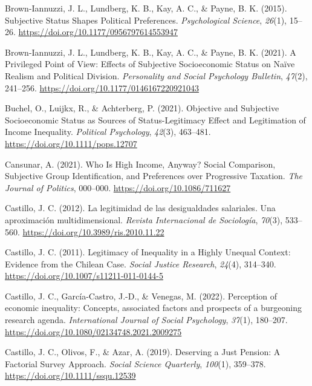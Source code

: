 \documentclass[
  12pt,
]{book}
\newlength{\cslhangindent}
\newenvironment{cslreferences}%
  {\setlength{\parindent}{0pt}%
  \everypar{\setlength{\hangindent}{\cslhangindent}}\ignorespaces}%
  {\par}
\begin{document}
\begin{cslreferences}
\leavevmode\hypertarget{ref-brown-iannuzzi_subjective_2015}{}%
Brown-Iannuzzi, J. L., Lundberg, K. B., Kay, A. C., \& Payne, B. K. (2015). Subjective Status Shapes Political Preferences. \emph{Psychological Science}, \emph{26}(1), 15--26. \url{https://doi.org/10.1177/0956797614553947}

\leavevmode\hypertarget{ref-brown-iannuzzi_privileged_2021}{}%
Brown-Iannuzzi, J. L., Lundberg, K. B., Kay, A. C., \& Payne, B. K. (2021). A Privileged Point of View: Effects of Subjective Socioeconomic Status on Naïve Realism and Political Division. \emph{Personality and Social Psychology Bulletin}, \emph{47}(2), 241--256. \url{https://doi.org/10.1177/0146167220921043}

\leavevmode\hypertarget{ref-buchel_objective_2021}{}%
Buchel, O., Luijkx, R., \& Achterberg, P. (2021). Objective and Subjective Socioeconomic Status as Sources of Status-Legitimacy Effect and Legitimation of Income Inequality. \emph{Political Psychology}, \emph{42}(3), 463--481. \url{https://doi.org/10.1111/pops.12707}

\leavevmode\hypertarget{ref-cansunar_who_2021}{}%
Cansunar, A. (2021). Who Is High Income, Anyway? Social Comparison, Subjective Group Identification, and Preferences over Progressive Taxation. \emph{The Journal of Politics}, 000--000. \url{https://doi.org/10.1086/711627}

\leavevmode\hypertarget{ref-Castillo2012b_multidimentional}{}%
Castillo, J. C. (2012). La legitimidad de las desigualdades salariales. Una aproximación multidimensional. \emph{Revista Internacional de Sociología}, \emph{70}(3), 533--560. \url{https://doi.org/10.3989/ris.2010.11.22}

\leavevmode\hypertarget{ref-Castillo2011}{}%
Castillo, J. C. (2011). Legitimacy of Inequality in a Highly Unequal Context: Evidence from the Chilean Case. \emph{Social Justice Research}, \emph{24}(4), 314--340. \url{https://doi.org/10.1007/s11211-011-0144-5}

\leavevmode\hypertarget{ref-castillo_perception_2022}{}%
Castillo, J. C., García-Castro, J.-D., \& Venegas, M. (2022). Perception of economic inequality: Concepts, associated factors and prospects of a burgeoning research agenda. \emph{International Journal of Social Psychology}, \emph{37}(1), 180--207. \url{https://doi.org/10.1080/02134748.2021.2009275}

\leavevmode\hypertarget{ref-castillo_deserving_2019}{}%
Castillo, J. C., Olivos, F., \& Azar, A. (2019). Deserving a Just Pension: A Factorial Survey Approach. \emph{Social Science Quarterly}, \emph{100}(1), 359--378. \url{https://doi.org/10.1111/ssqu.12539}


\end{cslreferences}
\end{document}
